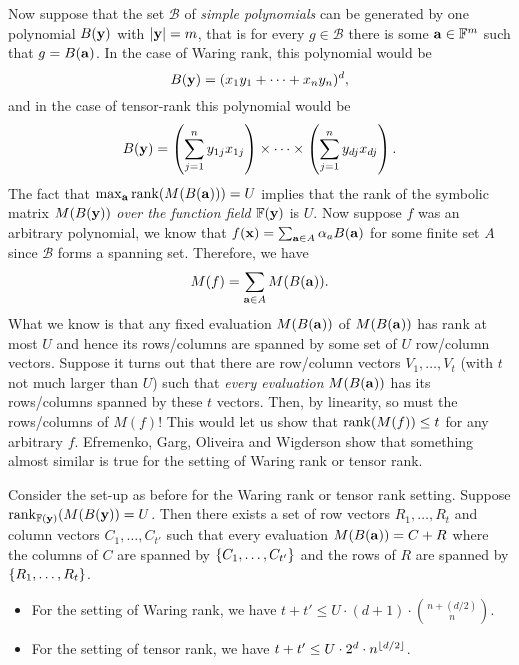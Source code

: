 Now suppose that the set $\mathcal{B}$ of \emph{simple polynomials} can be generated by one polynomial $B(\mathbf{y})$ with $\left|\mathbf{y}\right| = m$, that is for every $g\in \mathcal{B}$ there is some $\mathbf{a} \in \mathbb{F}^m$ such that $g = B(\mathbf{a})$. In the case of Waring rank, this polynomial would be \[B(\mathbf{y}) = (x_1 y_1 + \cdots + x_ny_n)^d,\] and in the case of tensor-rank this polynomial would be
\[ B(\mathbf{y}) = \left(\sum_{j=1}^n y_{1j} x_{1j}\right) \times \cdots \times \left(\sum_{j=1}^n y_{dj} x_{dj}\right). 
  \]
  The fact that $\max_{\mathbf{a}} \operatorname{rank}(M(B(\mathbf{a}))) = U$ implies that the rank of the symbolic matrix $M(B(\mathbf{y}))$ \emph{over the function field $\mathbb{F}(\mathbf{y})$} is $U$. Now suppose $f$ was an arbitrary polynomial, we know that $f(\mathbf{x}) = \sum_{\mathbf{a}\in A} \alpha_a B(\mathbf{a})$ for some finite set $A$ since $\mathcal{B}$ forms a spanning set. Therefore, we have
  \[
    M(f) = \sum_{\mathbf{a}\in A} M(B(\mathbf{a})).
  \]
  What we know is that any fixed evaluation $M(B(\mathbf{a}))$ of $M(B(\mathbf{a}))$ has rank at most $U$ and hence its rows/columns are spanned by some set of $U$ row/column vectors. Suppose it turns out that there are row/column vectors $V_1,\ldots, V_{t}$ (with $t$ not much larger than $U$) such that \emph{every evaluation} $M(B(\mathbf{a}))$ has its rows/columns spanned by these $t$ vectors. Then, by linearity, so must the rows/columns of $M(f)$! This would let us show that $\operatorname{rank}(M(f)) \leq t$  for any arbitrary $f$. Efremenko, Garg, Oliveira and Wigderson show that something almost similar is true for the setting of Waring rank or tensor rank.

  \begin{lemma} \label{lem:limitation:decomposition-eval-space}
    Consider the set-up as before for the Waring rank or tensor rank setting. Suppose $\operatorname{rank}_{\mathbb{F}(\mathbf{y})}(M(B(\mathbf{y})) = U$. Then there exists a set of row vectors $R_1,\ldots, R_t$ and column vectors $C_1,\ldots, C_{t'}$ such that every evaluation $M(B(\mathbf{a})) = C + R$ where the columns of $C$ are spanned by $\left\{C_1,\ldots, C_{t'}\right\}$ and the rows of $R$ are spanned by $\left\{R_1,\ldots, R_t\right\}$.

    \begin{itemize}
    \item  For the setting of Waring rank, we have $t + t' \leq U \cdot (d+1) \cdot \binom{n+(d/2)}{n}$.

    \item For the setting of tensor rank, we have $t+t' \leq U \cdot 2^{d} \cdot n^{\lfloor d/2 \rfloor}$.
    \end{itemize}
  \end{lemma}

